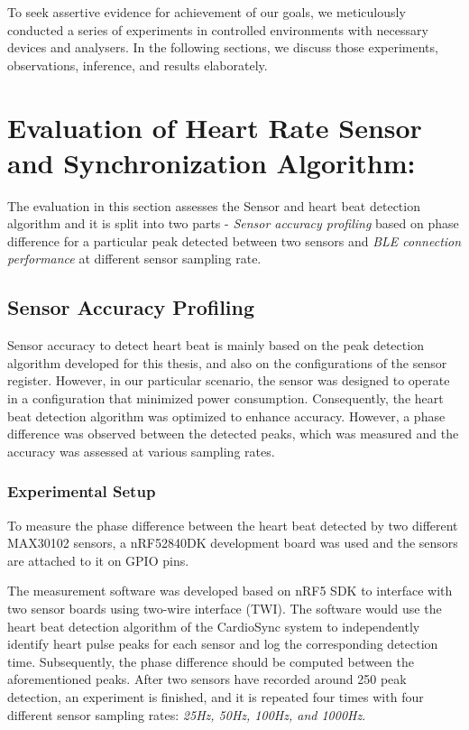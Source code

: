 \noindent To seek assertive evidence for achievement of our goals, we meticulously conducted a series of experiments in controlled environments with necessary devices and analysers. In the following sections, we discuss those experiments, observations, inference, and results elaborately.



\section{Evaluation of Heart Rate Sensor and Synchronization Algorithm:}
The evaluation in this section assesses the Sensor and heart beat detection algorithm and it is split into two parts - \textit{Sensor accuracy profiling} based on phase difference for a particular peak detected between two sensors and \textit{BLE connection performance} at different sensor sampling rate.

\subsection{Sensor Accuracy Profiling}
Sensor accuracy to detect heart beat is mainly based on the peak detection algorithm developed for this thesis, and also on the configurations of the sensor register. However, in our particular scenario, the sensor was designed to operate in a configuration that minimized power consumption. Consequently, the heart beat detection algorithm was optimized to enhance accuracy. However, a phase difference was observed between the detected peaks, which was measured and the accuracy was assessed at various sampling rates.

\subsubsection{Experimental Setup}
To measure the phase difference between the heart beat detected by two different MAX30102 sensors, a nRF52840DK development board \cite{nRF52840} was used and the sensors are attached to it on GPIO pins.

\noindent The measurement software was developed based on nRF5 SDK \cite{2023nRF5} to interface with two sensor boards using two-wire interface (TWI).  The software would use the heart beat detection algorithm of the CardioSync system to independently identify heart pulse peaks for each sensor and log the corresponding detection time. Subsequently, the phase difference should be computed between the aforementioned peaks. After two sensors have recorded around 250 peak detection, an experiment is finished, and it is repeated four times with four different sensor sampling rates: \textit{25Hz, 50Hz, 100Hz, and 1000Hz}.

